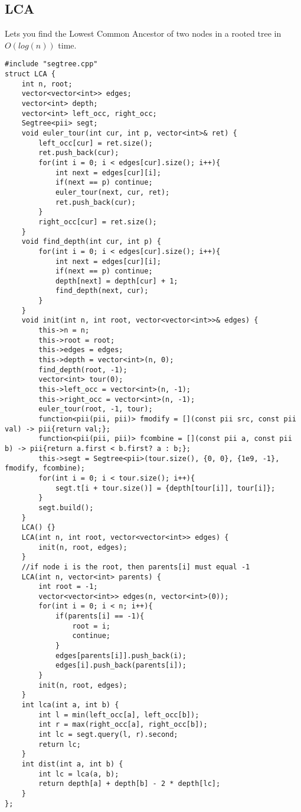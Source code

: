 \documentclass[8pt, headheight=10pt, a4paper]{article}
\begin{document}
\begin{multicols*}{3}
\subsection{LCA}
Lets you find the Lowest Common Ancestor of two nodes in a rooted tree in $O(log(n))$ time. 
\begin{lstlisting}
#include "segtree.cpp"
struct LCA {
    int n, root;
    vector<vector<int>> edges;
    vector<int> depth;
    vector<int> left_occ, right_occ;
    Segtree<pii> segt;
    void euler_tour(int cur, int p, vector<int>& ret) {
        left_occ[cur] = ret.size();
        ret.push_back(cur);
        for(int i = 0; i < edges[cur].size(); i++){
            int next = edges[cur][i];
            if(next == p) continue;
            euler_tour(next, cur, ret);
            ret.push_back(cur);
        }
        right_occ[cur] = ret.size();
    }
    void find_depth(int cur, int p) {
        for(int i = 0; i < edges[cur].size(); i++){
            int next = edges[cur][i];
            if(next == p) continue;
            depth[next] = depth[cur] + 1;
            find_depth(next, cur);
        }
    }
    void init(int n, int root, vector<vector<int>>& edges) {
        this->n = n;
        this->root = root;
        this->edges = edges;
        this->depth = vector<int>(n, 0);
        find_depth(root, -1);
        vector<int> tour(0);
        this->left_occ = vector<int>(n, -1);
        this->right_occ = vector<int>(n, -1);
        euler_tour(root, -1, tour);
        function<pii(pii, pii)> fmodify = [](const pii src, const pii val) -> pii{return val;};
        function<pii(pii, pii)> fcombine = [](const pii a, const pii b) -> pii{return a.first < b.first? a : b;};
        this->segt = Segtree<pii>(tour.size(), {0, 0}, {1e9, -1}, fmodify, fcombine);
        for(int i = 0; i < tour.size(); i++){
            segt.t[i + tour.size()] = {depth[tour[i]], tour[i]};
        }
        segt.build();
    }
    LCA() {}
    LCA(int n, int root, vector<vector<int>> edges) {
        init(n, root, edges);
    }
    //if node i is the root, then parents[i] must equal -1
    LCA(int n, vector<int> parents) {
        int root = -1;
        vector<vector<int>> edges(n, vector<int>(0));
        for(int i = 0; i < n; i++){
            if(parents[i] == -1){
                root = i;
                continue;
            }
            edges[parents[i]].push_back(i);
            edges[i].push_back(parents[i]);
        }
        init(n, root, edges);
    }
    int lca(int a, int b) {
        int l = min(left_occ[a], left_occ[b]);
        int r = max(right_occ[a], right_occ[b]);
        int lc = segt.query(l, r).second;
        return lc;
    }
    int dist(int a, int b) {
        int lc = lca(a, b);
        return depth[a] + depth[b] - 2 * depth[lc];
    }
};
\end{lstlisting}


\end{multicols*}
\end{document}
